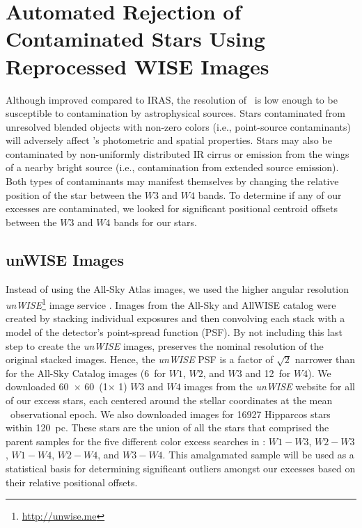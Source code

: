 \section{Automated Rejection of Contaminated Stars Using Reprocessed WISE Images}\label{sec:auto_rejunwise}

    Although improved compared to IRAS, the resolution of \WS\ is low enough to be susceptible to contamination by astrophysical sources. Stars contaminated from unresolved blended objects with non-zero colors (i.e., point-source contaminants) will adversely affect \WS's photometric and spatial properties. Stars may also be contaminated by non-uniformly distributed IR cirrus or emission from the wings of a nearby bright source (i.e., contamination from extended source emission). Both types of contaminants may manifest themselves by changing the relative position of the star between the $W3$ and $W4$ bands. To determine if any of our excesses are contaminated, we looked for significant positional centroid offsets between the $W3$ and $W4$ bands for our stars. 
    
    \subsection{unWISE Images}\label{sec:centroid_calc}
    
    Instead of using the All-Sky Atlas images, we used the higher angular resolution \textit{unWISE}\footnote{\url{http://unwise.me}} image service \citep{Lang2014}. Images from the All-Sky and AllWISE catalog were created by stacking individual exposures and then convolving each stack with a model of the detector's point-spread function (PSF). By not including this last step to create the \textit{unWISE} images, \citet{Lang2014} preserves the nominal resolution of the original stacked images. Hence, the \textit{unWISE} PSF is a factor of $\sqrt{2}$ narrower than for the All-Sky Catalog images (6\arcsec\ for $W1$, $W2$, and $W3$ and 12\arcsec\ for $W4$). We downloaded 60\arcsec\ $\times$ 60\arcsec\ (1\arcmin $\times$ 1\arcmin) $W3$ and $W4$ images from the \textit{unWISE} website for all of our excess stars, each centered around the stellar coordinates at the mean \WS\ observational epoch. We also downloaded images for 16927 Hipparcos stars within 120~pc. These stars are the union of all the stars that comprised the parent samples for the five different color excess searches in : $W1-W3$, $W2-W3$, $W1-W4$, $W2-W4$, and $W3-W4$. This amalgamated sample will be used as a statistical basis for determining significant outliers amongst our excesses based on their relative positional offsets. 
    
